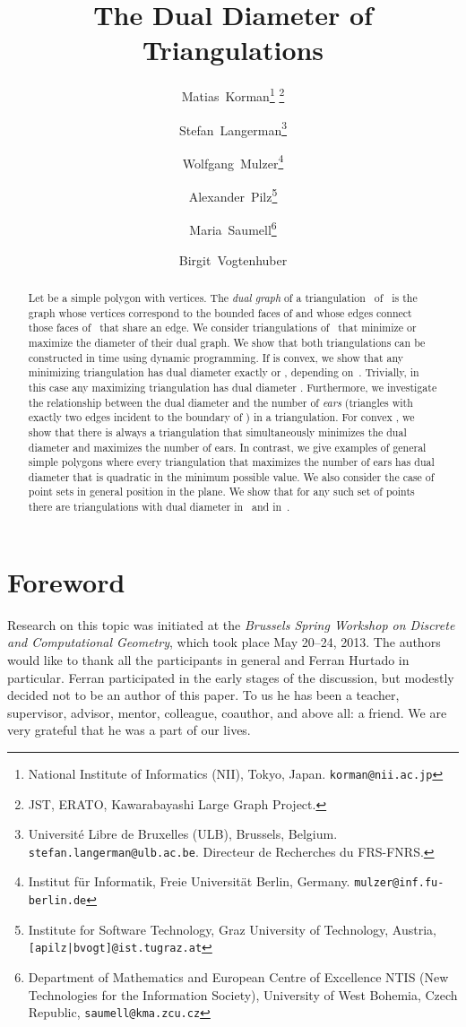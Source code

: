 \documentclass{article}
\title{The Dual Diameter of Triangulations}
\author{
Matias~Korman\thanks{National
Institute of Informatics (NII), Tokyo, Japan. {\tt korman@nii.ac.jp}}
\thanks{JST, ERATO, Kawarabayashi Large Graph Project.}
\and Stefan~Langerman\thanks{Universit\'e Libre de
Bruxelles (ULB), Brussels, Belgium.
{\tt stefan.langerman@ulb.ac.be}. Directeur de Recherches du FRS-FNRS.}
\and Wolfgang~Mulzer\thanks{Institut f\"ur Informatik, Freie
	Universit\"at Berlin,
 Germany. {\tt mulzer@inf.fu-berlin.de}}
\and Alexander~Pilz\thanks{Institute for Software Technology,
Graz University of Technology, Austria, {\tt [apilz|bvogt]@ist.tugraz.at}}
\and Maria~Saumell\thanks{Department of Mathematics and European Centre of Excellence NTIS (New Technologies for the Information Society), University of West Bohemia, Czech Republic, {\tt saumell@kma.zcu.cz}}
\and Birgit~Vogtenhuber\footnotemark[6]
}
\begin{document}
\maketitle

\begin{abstract}
Let  be a simple polygon with  vertices.
The \emph{dual graph}  of a triangulation~ of~
is the graph whose vertices correspond to the bounded faces of
 and whose edges connect those faces of~ that share an edge.
We consider triangulations of~ that minimize or maximize the 
diameter of their dual graph. 
We show that both triangulations can be constructed in  time
using dynamic programming.
If  is convex, we show that any minimizing triangulation has dual 
diameter exactly  or 
, depending on~. Trivially, in this
case any maximizing triangulation has dual diameter .
Furthermore, we investigate the relationship between the dual diameter 
and the number of \emph{ears} (triangles with exactly two edges incident 
to the boundary of ) in a triangulation. 
For convex , we show that there is always a triangulation that
simultaneously minimizes the dual diameter and maximizes the number of 
ears.
In contrast, we give examples of general simple polygons where every 
triangulation that maximizes the number of ears has dual diameter that 
is quadratic in the minimum possible value.
We also consider the case of point sets in general position in the plane. 
We show that for any such set of  points there are triangulations with 
dual diameter in~ and in~.
\end{abstract}







\section*{Foreword}
Research on this topic was initiated at the \emph{Brussels Spring 
Workshop on Discrete and Computational Geometry}, which took place 
May 20--24, 2013.  The authors would like to thank all the participants in general and  Ferran Hurtado in particular. Ferran participated in the early stages of the discussion, but modestly decided not to be an author of this paper. To us he has been a teacher, supervisor, advisor, mentor, colleague, coauthor, and above all: a friend. We are very grateful that he was a part of our lives.
\end{document}
